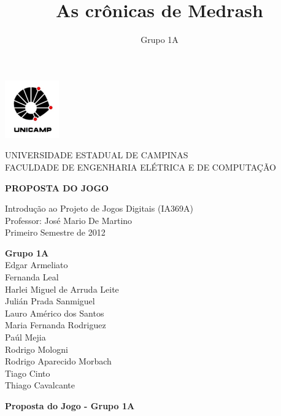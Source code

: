 \documentclass[letterpaper,11pt]{article}
\title{ As cr\^{o}nicas de Medrash }
\author{ Grupo 1A }
\date{ }
\begin{document}
\begin{center}
\begin{minipage}{2.4 cm}
\begin{center}
\includegraphics{logo.png}
\end{center}
\end{minipage}
\begin{minipage}{12 cm}
\begin{center}
\Large
UNIVERSIDADE ESTADUAL DE CAMPINAS \\
FACULDADE DE ENGENHARIA ELÉTRICA E DE COMPUTAÇÃO
\end{center}
\end{minipage}
\end{center}

\vspace{6 cm}
\begin{center}
{\bf \large PROPOSTA DO JOGO}
\vspace{0.5 cm}

Introdução ao Projeto de Jogos Digitais (IA369A) \\
Professor: José Mario De Martino \\
Primeiro Semestre de 2012
\end{center}
\vspace{3 cm}
\begin{flushright}
{\bf Grupo 1A} \\
Edgar Armeliato \\
Fernanda Leal \\
Harlei Miguel de Arruda Leite \\
Julián Prada Sanmiguel \\
Lauro Américo dos Santos \\
Maria Fernanda Rodriguez \\
Paúl Mejia \\
Rodrigo Mologni \\
Rodrigo Aparecido Morbach \\
Tiago Cinto \\
Thiago Cavalcante
\end{flushright}

\newpage
\tableofcontents
\newpage

{\bf Proposta do Jogo - Grupo 1A}
\end{document}
